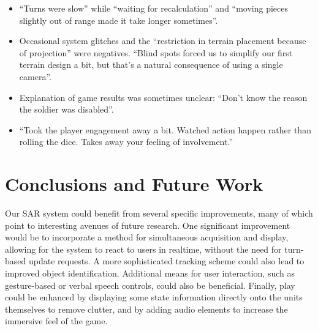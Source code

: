 \documentclass[review]{vgtc}                 %
\begin{document}
\begin{itemize}

\vspace{-0.05in}
\item ``Turns were slow'' while ``waiting for recalculation'' and
  ``moving pieces slightly out of range made it take longer
  sometimes''. \vspace{\mysep}


\item
Occasional system glitches and the ``restriction in terrain placement because of projection'' were negatives.
``Blind spots forced us to simplify our first terrain design a bit,
but that's a natural consequence of using a single camera''.
\vspace{\mysep}

\item
Explanation of game results was sometimes unclear: 
``Don't know the reason the soldier was disabled''.
\vspace{\mysep}

\item
``Took the player engagement away a bit.  Watched action happen rather
than rolling the dice.  Takes away your feeling of involvement.''

\end{itemize}









\section{Conclusions and Future Work}

Our SAR system could benefit from several specific improvements, many
of which point to interesting avenues of future research.  One
significant improvement would be to incorporate a method for
simultaneous acquisition and display, allowing for the system to react
to users in realtime, without the need for turn-based update requests.
A more sophisticated tracking scheme could also lead to improved
object identification. Additional means for user interaction, such as
gesture-based or verbal speech controls, could also be beneficial.
Finally, play could be enhanced by displaying some state information
directly onto the units themselves to remove clutter, and by adding
audio elements to increase the immersive feel of the game.
\end{document}
